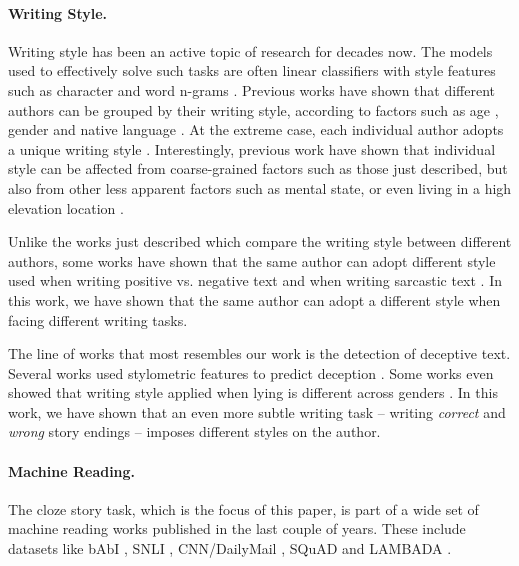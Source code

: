 \documentclass[11pt,a4paper]{article}
\begin{document}
\paragraph{Writing Style.}
Writing style has been an active topic of research for decades now. 
The models used to effectively solve  such tasks are often linear classifiers with style features such as character and word n-grams \cite{Stamatatos:2009,Koppel:2009}.
Previous works have shown that different authors can be grouped by their writing style, according to factors such as age \cite{Pennebaker:2003,Argamon:2003,Schler:2006,Rosenthal:2011}, gender \cite{Argamon:2003,Schler:2006} and native language \cite{Koppel:2005}.
At the extreme case, each individual author adopts a unique writing style \cite{pennebaker1999linguistic,Schwartz:2013}. 
Interestingly, previous work have shown that individual style can be affected from coarse-grained factors such as those just described, but also from other less apparent factors such as mental state, or even living in a high elevation location \cite{schwartz2013personality}.

Unlike the works just described which compare the writing style between different authors, some works have shown that the same author can adopt different style used when writing positive vs. negative text \cite{Davidov:2010} and when writing sarcastic text \cite{Tsur:2010}. In this work, we have shown that the same author can adopt a different style when facing different writing tasks.

The line of works that most resembles our work is the detection of deceptive text. 
Several works used stylometric features to  predict deception 
\cite{Newman:2003,hancock2007lying,ott2011finding,Feng:2012}.
Some works even showed that writing style applied when lying is different across genders \cite{Perez:2014a,Perez:2014b}.
In this work, we have shown that an even more subtle writing task -- writing {\it correct} and {\it wrong} story endings -- imposes different styles on the author.


\paragraph{Machine Reading.}
The cloze story task, which is the focus of this paper, is part of a wide set of machine reading works published in the last couple of years.
These include datasets like bAbI \cite{Weston:2015}, SNLI \cite{bowman2015large}, CNN/DailyMail \cite{hermann2015teaching}, SQuAD \cite{rajpurkar2016squad} and LAMBADA \cite{Paperno:2016}. 
\end{document}
